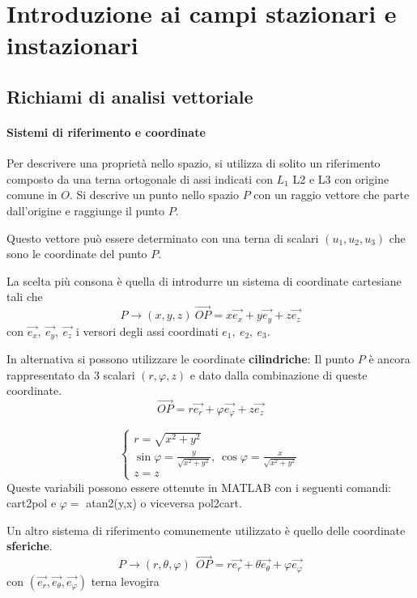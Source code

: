 
\section{Introduzione ai campi stazionari e instazionari}
\subsection{Richiami di analisi vettoriale}
\paragraph{Sistemi di riferimento e coordinate}
Per descrivere una proprietà nello spazio, si utilizza di solito un riferimento composto da 
una terna ortogonale di assi indicati con $L_1$ L2 e L3 con origine comune in $O$.
Si descrive un punto nello spazio $P$ con un raggio vettore che parte dall'origine e 
raggiunge il punto $P$.

Questo vettore può essere determinato con una terna di scalari $(u_1,u_2,u_3)$ che sono le coordinate del 
punto $P$.

La scelta più consona è quella di introdurre un sistema di coordinate cartesiane tali che 
$$
P \rightarrow (x,y,z)\ \vec{OP} = x\vec{e_x} + y\vec{e_y} + z\vec{e_z}
$$
con $\vec{e_x},\ \vec{e_y},\ \vec{e_z}$ i versori degli assi coordinati $e_1,\ e_2,\ e_3$.

In alternativa si possono utilizzare le coordinate \textbf{cilindriche}:
Il punto $P$ è ancora rappresentato da 3 scalari $(r,\varphi, z)$ e dato dalla combinazione di queste 
coordinate.
$$
\vec{OP} = r\vec{e_r} + \varphi\vec{e_{\varphi}} + z\vec{e_z}
$$

$$
\begin{cases}
r = \sqrt{x^2+y^2}\\
\sin\varphi = \frac{y}{\sqrt{x^2+y^2}},\ \cos\varphi = \frac{x}{\sqrt{x^2+y^2}}\\
z = z
\end{cases}
$$
Queste variabili possono essere ottenute in MATLAB con i seguenti comandi:
cart2pol e $\varphi= $ atan2(y,x) o viceversa pol2cart.

Un altro sistema di riferimento comunemente utilizzato è quello delle coordinate \textbf{sferiche}.
$$
P\rightarrow (r,\theta,\varphi)\ \ \vec{OP} = r\vec{e_r} + \theta\vec{e_\theta} + \varphi \vec{e_\varphi}
$$
con $(\vec{e_r},\vec{e_\theta},\vec{e_\varphi})$ terna levogira

